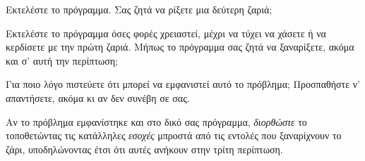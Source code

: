 \documentclass[a4paper,11pt,oneside]{book}
\begin{document}
\begin{step}
Εκτελέστε το πρόγραμμα. Σας ζητά να ρίξετε μια δεύτερη ζαριά;

\marginnote[14pt]{\icondiscuss}
\dottedline

Εκτελέστε το πρόγραμμα όσες φορές χρειαστεί, μέχρι να τύχει να χάσετε ή να κερδίσετε με την πρώτη ζαριά. Μήπως το πρόγραμμα σας ζητά να ξαναρίξετε, ακόμα και σ' αυτή την περίπτωση;

\marginnote[14pt]{\icondiscuss}
\dottedline

Για ποιο λόγο πιστεύετε ότι μπορεί να εμφανιστεί αυτό το πρόβλημα; Προσπαθήστε ν' απαντήσετε, ακόμα κι αν δεν συνέβη σε σας.

\marginnote[14pt]{\icondiscuss}
\dottedline

\dottedline

\marginnote[18pt]{\iconcaution}
Αν το πρόβλημα εμφανίστηκε και στο δικό σας πρόγραμμα, \emph{διορθώστε} το τοποθετώντας τις κατάλληλες \emph{εσοχές} μπροστά από τις εντολές που ξαναρίχνουν το ζάρι, υποδηλώνοντας έτσι ότι αυτές ανήκουν στην τρίτη περίπτωση.
\end{step}
\end{document}
